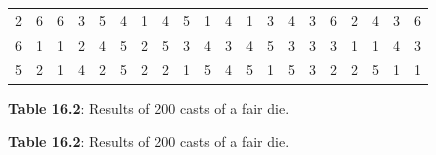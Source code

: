 \begin{description}[noitemsep]
\begin{description}[noitemsep]
\begin{table}[H]
\begin{center}
\begin{xtabular}[t]{|l|l|l|l|l|l|l|l|l|l|l|l|l|l|l|l|l|l|l|l|}
        2 &
        6 &
        6 &
        3 &
        5 &
        4 &
        1 &
        4 &
        5 &
        1 &
        4 &
        1 &
        3 &
        4 &
        3 &
        6 &
        2 &
        4 &
        3 &
        6%
     \tabularnewline{}
        6 &
        1 &
        1 &
        2 &
        4 &
        5 &
        2 &
        5 &
        3 &
        4 &
        3 &
        4 &
        5 &
        3 &
        3 &
        3 &
        1 &
        1 &
        4 &
        3%
     \tabularnewline{}
        5 &
        2 &
        1 &
        4 &
        2 &
        5 &
        2 &
        2 &
        1 &
        5 &
        4 &
        5 &
        1 &
        5 &
        3 &
        2 &
        2 &
        5 &
        1 &
        1%
     \tabularnewline{}
    \end{xtabular}
      \end{center}
    \begin{center}{\small\bfseries Table 16.2}: Results of 200 casts of a fair die.\end{center}
    \begin{caption}{\small\bfseries Table 16.2}: Results of 200 casts of a fair die.\end{caption}
\end{table}
    \par
      \label{m39403*uid28}

\end{description}
\end{description}
